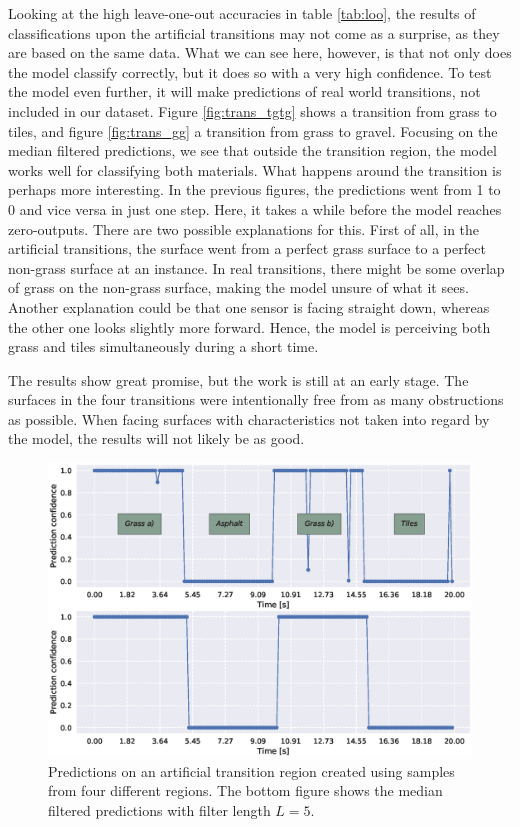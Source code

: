 Looking at the high leave-one-out accuracies in table \ref{tab:loo}, the results of classifications upon the artificial transitions may not come as a surprise, as they are based on the same data. What we can see here, however, is that not only does the model classify correctly, but it does so with a very high confidence. To test the model even further, it will make predictions of real world transitions, not included in our dataset. Figure \ref{fig:trans_tgtg} shows a transition from grass to tiles, and figure \ref{fig:trans_gg} a transition from grass to gravel. Focusing on the median filtered predictions, we see that outside the transition region, the model works well for classifying both materials. What happens around the transition is perhaps more interesting. In the previous figures, the predictions went from 1 to 0 and vice versa in just one step. Here, it takes a while before the model reaches zero-outputs. There are two possible explanations for this. First of all, in the artificial transitions, the surface went from a perfect grass surface to a perfect non-grass surface at an instance. In real transitions, there might be some overlap of grass on the non-grass surface, making the model unsure of what it sees. Another explanation could be that one sensor is facing straight down, whereas the other one looks slightly more forward. Hence, the model is perceiving both grass and tiles simultaneously during a short time. 

The results show great promise, but the work is still at an early stage. The surfaces in the four transitions were intentionally free from as many obstructions as possible. When facing surfaces with characteristics not taken into regard by the model, the results will not likely be as good. 

\begin{figure}
	\centering
	\includegraphics[scale=0.5]{figs_temp/varmats1}
	\caption{Predictions on an artificial transition region created using samples from four different regions. The bottom figure shows the median filtered predictions with filter length $L=5$.}
	\label{fig:artificial1}
\end{figure}

